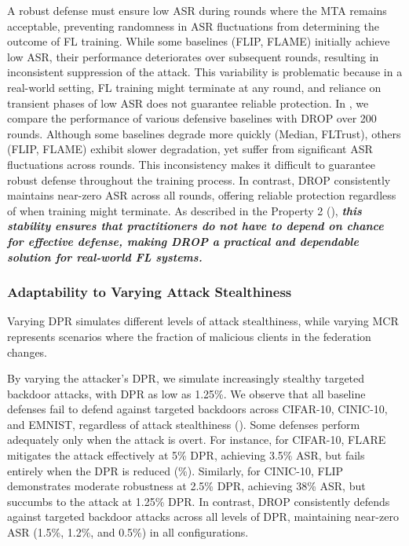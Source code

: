  A robust defense must ensure low ASR during rounds where the MTA remains acceptable, preventing randomness in ASR fluctuations from determining the outcome of FL training. While some baselines (\eg FLIP, FLAME) initially achieve low ASR, their performance deteriorates over subsequent rounds, resulting in inconsistent suppression of the attack. This variability is problematic because in a real-world setting, FL training might terminate at any round, and reliance on transient phases of low ASR does not guarantee reliable protection. In , we compare the performance of various defensive baselines with DROP over 200 rounds. Although some baselines degrade more quickly (\eg Median, FLTrust), others (\eg FLIP, FLAME) exhibit slower degradation, yet suffer from significant ASR fluctuations across rounds. This inconsistency makes it difficult to guarantee robust defense throughout the training process. In contrast, DROP consistently maintains near-zero ASR across all rounds, offering reliable protection regardless of when training might terminate. As described in the Property 2 (), \textbf{\textit{this stability ensures that practitioners do not have to depend on chance for effective defense, making DROP a practical and dependable solution for real-world FL systems.}}

\subsubsection{Adaptability to Varying Attack Stealthiness}
Varying DPR simulates different levels of attack stealthiness, while varying MCR represents scenarios where the fraction of malicious clients in the federation changes.


By varying the attacker's DPR, we simulate increasingly stealthy targeted backdoor attacks, with DPR as low as 1.25\%. We observe that all baseline defenses fail to defend against targeted backdoors across CIFAR-10, CINIC-10, and EMNIST, regardless of attack stealthiness ().  
Some defenses perform adequately only when the attack is overt. For instance, for CIFAR-10, FLARE mitigates the attack effectively at 5\% DPR, achieving 3.5\% ASR, but fails entirely when the DPR is reduced (\%). Similarly, for CINIC-10, FLIP demonstrates moderate robustness at 2.5\% DPR, achieving 38\% ASR, but succumbs to the attack at 1.25\% DPR. In contrast, DROP consistently defends against targeted backdoor attacks across all levels of DPR, maintaining near-zero ASR (1.5\%, 1.2\%, and 0.5\%) in all configurations.

